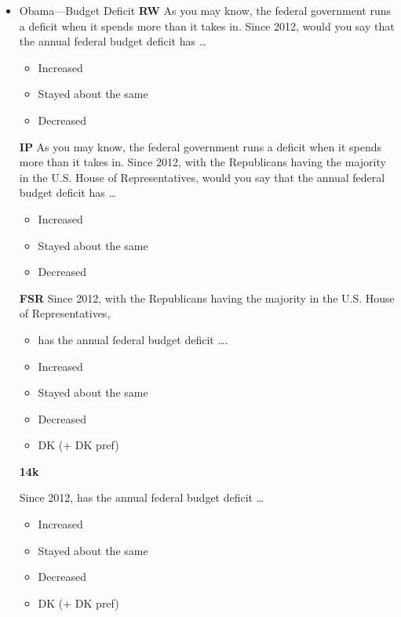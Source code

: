 \begin{itemize}
	\item Obama—Budget Deficit\newline
	\textbf{RW}\newline
	As you may know, the federal government runs a deficit when it spends more than it
	takes in. Since 2012, would you say that the annual federal budget deficit has \ldots
	\begin{itemize}
		\item Increased
		\item Stayed about the same
		\item Decreased
	\end{itemize}
	
	\textbf{IP}\newline
	As you may know, the federal government runs a deficit when it spends more than it
	takes in. Since 2012, with the Republicans having the majority in the U.S. House of
	Representatives, would you say that the annual federal budget deficit has \ldots
	\begin{itemize}
		\item Increased
		\item Stayed about the same
		\item Decreased
	\end{itemize}
	
	\textbf{FSR}\newline
	Since 2012, with the Republicans having the majority in the U.S. House of
	Representatives,
	\begin{itemize}
		\item has the annual federal budget deficit \ldots.
		\item Increased
		\item Stayed about the same
		\item Decreased
		\item DK (+ DK pref)
	\end{itemize}
	
	\textbf{14k}\newline
	
	Since 2012, has the annual federal budget deficit \ldots
	\begin{itemize}
		\item Increased
		\item Stayed about the same
		\item Decreased
		\item DK (+ DK pref)
	\end{itemize}
\end{itemize}

